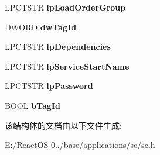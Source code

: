 \begin{DoxyCompactItemize}
L\+P\+C\+T\+S\+TR {\bfseries lp\+Load\+Order\+Group}
\item 
\mbox{\label{struct_s_e_r_v_i_c_e___c_r_e_a_t_e___i_n_f_o_abcb69872974bb38213b53bc9e3b2de36}} 
D\+W\+O\+RD {\bfseries dw\+Tag\+Id}
\item 
\mbox{\label{struct_s_e_r_v_i_c_e___c_r_e_a_t_e___i_n_f_o_a0d759ed7a1722b18cb8b4e75e72fb847}} 
L\+P\+C\+T\+S\+TR {\bfseries lp\+Dependencies}
\item 
\mbox{\label{struct_s_e_r_v_i_c_e___c_r_e_a_t_e___i_n_f_o_aeb9292ee8b5b7261c9981d5fb398bcde}} 
L\+P\+C\+T\+S\+TR {\bfseries lp\+Service\+Start\+Name}
\item 
\mbox{\label{struct_s_e_r_v_i_c_e___c_r_e_a_t_e___i_n_f_o_a0dbc48da84613bc2f9e55472abd9bf1c}} 
L\+P\+C\+T\+S\+TR {\bfseries lp\+Password}
\item 
\mbox{\label{struct_s_e_r_v_i_c_e___c_r_e_a_t_e___i_n_f_o_aa68895e9d3af58b6a20fb245d34e506a}} 
B\+O\+OL {\bfseries b\+Tag\+Id}
\end{DoxyCompactItemize}


该结构体的文档由以下文件生成\+:\begin{DoxyCompactItemize}
\item 
E\+:/\+React\+O\+S-\/0../base/applications/sc/sc.\+h\end{DoxyCompactItemize}
